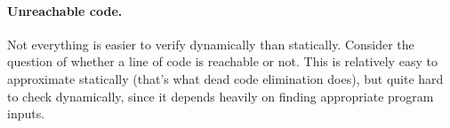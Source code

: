 \documentclass[11pt]{article}
\begin{document}
\paragraph{Unreachable code.} Not everything is easier to verify dynamically
than statically. Consider the question of whether a line of code is reachable
or not. This is relatively easy to approximate statically (that's what dead
code elimination does), but quite hard to check dynamically, since it depends
heavily on finding appropriate program inputs.
\end{document}
